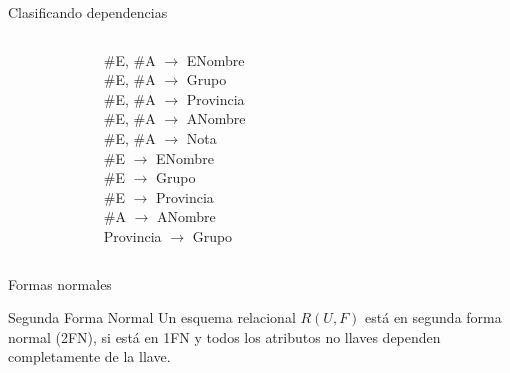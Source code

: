 \begin{frame}{Clasificando dependencias}
    \centering
    \begin{columns}[T]
        \begin{column}{0.2\linewidth}
            
        \end{column}
        \begin{column}{0.3\linewidth}
            {
            \#E, \#A $\to$ ENombre\\
            \#E, \#A $\to$ Grupo\\
            \#E, \#A $\to$ Provincia\\
            \#E, \#A $\to$ ANombre\\
            \vspace{1mm}
            }
            {
            \#E, \#A $\to$ Nota\\
            \#E $\to$ ENombre\\
            \#E $\to$ Grupo\\
            \#E $\to$ Provincia\\
            \#A $\to$ ANombre\\
            Provincia $\to$ Grupo
            }
        \end{column}
        \begin{column}{0.3\linewidth}
        \end{column}
        \begin{column}{0.2\linewidth}
            
        \end{column}
    \end{columns}
        
\end{frame}

\begin{frame}{Formas normales}
    \begin{block}{Segunda Forma Normal}
        Un esquema relacional $R(U,F)$ est\'a en segunda
        forma normal (2FN), si est\'a en 1FN y todos los atributos
        no llaves dependen completamente de la llave.
        
    \end{block}
\end{frame}


